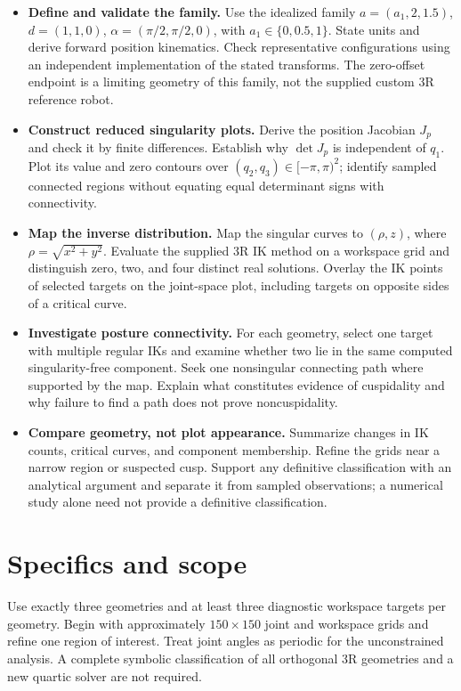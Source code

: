 \documentclass[11pt,a4paper]{article}
\begin{document}
\begin{itemize}
  \item \textbf{Define and validate the family.} Use the idealized family
$a=(a_1,2,1.5)$, $d=(1,1,0)$, $\alpha=(\pi/2,\pi/2,0)$, with
$a_1\in\{0,0.5,1\}$. State units and derive forward position kinematics.
Check representative configurations using an independent implementation of the
stated transforms. The zero-offset endpoint is a limiting geometry of this
family, not the supplied custom 3R reference robot.

  \item \textbf{Construct reduced singularity plots.} Derive the position Jacobian
$J_p$ and check it by finite differences. Establish why $\det J_p$ is independent
of $q_1$. Plot its value and zero contours over $(q_2,q_3)\in[-\pi,\pi)^2$;
identify sampled connected regions without equating equal determinant signs
with connectivity.

  \item \textbf{Map the inverse distribution.} Map the singular curves to
$(\rho,z)$, where $\rho=\sqrt{x^2+y^2}$. Evaluate the supplied 3R IK method on
a workspace grid and distinguish zero, two, and four distinct real solutions.
Overlay the IK points of selected targets on the joint-space plot, including
targets on opposite sides of a critical curve.

  \item \textbf{Investigate posture connectivity.} For each geometry, select one target
with multiple regular IKs and examine whether two lie in the same computed
singularity-free component. Seek one nonsingular connecting path where supported
by the map. Explain what constitutes evidence of cuspidality and why failure
to find a path does not prove noncuspidality.

  \item \textbf{Compare geometry, not plot appearance.} Summarize changes in IK counts,
critical curves, and component membership. Refine the grids near a narrow region
or suspected cusp. Support any definitive classification with an analytical
argument and separate it from sampled observations; a numerical study alone
need not provide a definitive classification.
\end{itemize}

\newpage
\section*{Specifics and scope}
Use exactly three geometries and at least three diagnostic workspace targets
per geometry. Begin with approximately $150\times150$ joint and workspace grids
and refine one region of interest. Treat joint angles as periodic for the
unconstrained analysis. A complete symbolic classification of all orthogonal
3R geometries and a new quartic solver are not required.
\end{document}

